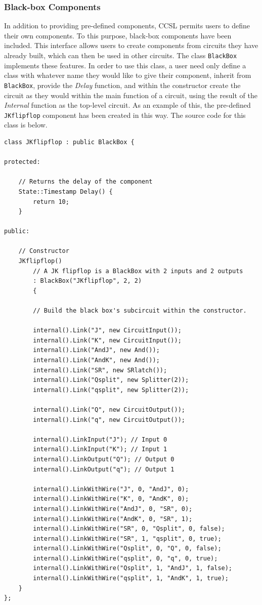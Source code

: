 \documentclass{article}
\newcommand{\ClassName}[1]{\texttt{#1}}
\newcommand{\FunctionName}[1]{\textit{#1}}
\begin{document}
\subsubsection{Black-box Components}

In addition to providing pre-defined components, CCSL permits users to define their own components. To this purpose, black-box components have been included. This interface allows users to create components from circuits they have already built, which can then be used in other circuits. The class \ClassName{BlackBox} implements these features. In order to use this class, a user need only define a class with whatever name they would like to give their component, inherit from \ClassName{BlackBox}, provide the \FunctionName{Delay} function, and within the constructor create the circuit as they would within the main function of a circuit, using the result of the \FunctionName{Internal} function as the top-level circuit. As an example of this, the pre-defined \ClassName{JKflipflop} component has been created in this way. The source code for this class is below.

\begin{lstlisting}
class JKflipflop : public BlackBox {

protected:

    // Returns the delay of the component
    State::Timestamp Delay() {
        return 10;
    }

public:

    // Constructor
    JKflipflop()
        // A JK flipflop is a BlackBox with 2 inputs and 2 outputs
        : BlackBox("JKflipflop", 2, 2)
        {

        // Build the black box's subcircuit within the constructor.

        internal().Link("J", new CircuitInput());
        internal().Link("K", new CircuitInput());
        internal().Link("AndJ", new And());
        internal().Link("AndK", new And());
        internal().Link("SR", new SRlatch());
        internal().Link("Qsplit", new Splitter(2));
        internal().Link("qsplit", new Splitter(2));

        internal().Link("Q", new CircuitOutput());
        internal().Link("q", new CircuitOutput());

        internal().LinkInput("J"); // Input 0
        internal().LinkInput("K"); // Input 1
        internal().LinkOutput("Q"); // Output 0
        internal().LinkOutput("q"); // Output 1

        internal().LinkWithWire("J", 0, "AndJ", 0);
        internal().LinkWithWire("K", 0, "AndK", 0);
        internal().LinkWithWire("AndJ", 0, "SR", 0);
        internal().LinkWithWire("AndK", 0, "SR", 1);
        internal().LinkWithWire("SR", 0, "Qsplit", 0, false);
        internal().LinkWithWire("SR", 1, "qsplit", 0, true);
        internal().LinkWithWire("Qsplit", 0, "Q", 0, false);
        internal().LinkWithWire("qsplit", 0, "q", 0, true);
        internal().LinkWithWire("Qsplit", 1, "AndJ", 1, false);
        internal().LinkWithWire("qsplit", 1, "AndK", 1, true);
    }
};
\end{lstlisting}
\end{document}
